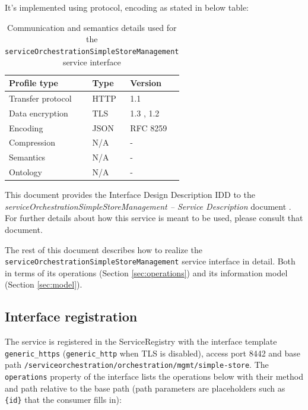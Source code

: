 \documentclass[a4paper]{arrowhead}
\begin{document}
It's implemented using protocol, encoding as stated in below table:
\begin{table}[ht!]
  \centering
  \begin{tabular}{|l|l|l|}
    \hline
    \rowcolor{gray!33} Profile type & Type & Version \\ \hline
    Transfer protocol & HTTP & 1.1 \cite{rfc9112} \\ \hline
    Data encryption & TLS & 1.3 \cite{rfc8446}, 1.2 \cite{rfc5246} \\ \hline
    Encoding & JSON & RFC 8259 \cite{rfc8259} \\ \hline
    Compression & N/A & - \\ \hline
    Semantics & N/A & - \\ \hline
    Ontology & N/A & - \\ \hline
  \end{tabular}
  \caption{Communication and semantics details used for the \texttt{service\allowbreak{}Orchestration\allowbreak{}Simple\allowbreak{}Store\allowbreak{}Management} service interface}
  \label{tab:comunication_semantics_profile}
\end{table}

This document provides the Interface Design Description IDD to the \textit{serviceOrchestrationSimpleStoreManagement -- Service Description} document \cite{ssso-serviceOrchestrationSimpleStoreManagement-sd}.
For further details about how this service is meant to be used, please consult that document.

The rest of this document describes how to realize the \texttt{service\allowbreak{}Orchestration\allowbreak{}Simple\allowbreak{}Store\allowbreak{}Management} service
interface in detail. Both in terms of its operations (Section \ref{sec:operations}) and its information model (Section \ref{sec:model}).

\subsection{Interface registration}

The service is registered in the ServiceRegistry with the interface template \texttt{generic\_\allowbreak{}https} (\texttt{generic\_\allowbreak{}http} when TLS is disabled), access port 8442 and base path \texttt{/\allowbreak{}serviceorchestration/\allowbreak{}orchestration/\allowbreak{}mgmt/\allowbreak{}simple-\allowbreak{}store}. The \texttt{operations} property of the interface lists the operations below with their method and path relative to the base path (path parameters are placeholders such as \texttt{\{id\}} that the consumer fills in):
\end{document}
